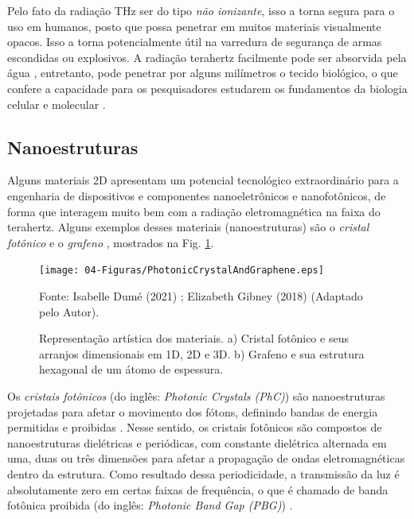 Pelo fato da radiação THz ser do tipo \textit{não ionizante}, isso a torna segura para o uso em humanos, posto que possa penetrar em muitos materiais visualmente opacos. Isso a torna potencialmente útil na varredura de segurança de armas escondidas ou explosivos. A radiação terahertz facilmente pode ser absorvida pela água \cite{fukunaga2009terahertz}, entretanto, pode penetrar por alguns milímetros o tecido biológico, o que confere a capacidade para os pesquisadores estudarem os fundamentos da biologia celular e molecular \cite{tsurkan2013impact}.

\subsection{Nanoestruturas}

Alguns materiais 2D apresentam um potencial tecnológico extraordinário para a engenharia de dispositivos e componentes nanoeletrônicos e nanofotônicos, de forma que interagem muito bem com a radiação eletromagnética na faixa do terahertz. Alguns exemplos desses materiais (nanoestruturas) são o \textit{cristal fotônico} e o \textit{grafeno} \cite{Wang2018THz,Vitiello_2019}, mostrados na Fig. \ref{fig: PhotonicCrystalAndGraphene}.

\begin{figure}[H]
    \centering
    \texttt{[image: 04-Figuras/PhotonicCrystalAndGraphene.eps]}
    \caption{Representação artística dos materiais. a) Cristal fotônico e seus arranjos dimensionais em 1D, 2D e 3D. b) Grafeno e sua estrutura hexagonal de um átomo de espessura.} \par
    Fonte: Isabelle Dumé (2021) \cite{Physicsworld2021Isabelle}; Elizabeth Gibney (2018) \cite{Nature2018Gibney} (Adaptado pelo Autor).
    \label{fig: PhotonicCrystalAndGraphene}
\end{figure}

Os \textit{cristais fotônicos} (do inglês: \textit{Photonic Crystals (PhC)}) são nanoestruturas projetadas para afetar o movimento dos fótons, definindo bandas de energia permitidas e proibidas \cite{ohtsu2008principles,shen2002nanophotonics}. Nesse sentido, os cristais fotônicos são compostos de nanoestruturas dielétricas e periódicas, com constante dielétrica alternada em uma, duas ou três dimensões para afetar a propagação de ondas eletromagnéticas dentro da estrutura. Como resultado dessa periodicidade, a transmissão da luz é absolutamente zero em certas faixas de frequência, o que é chamado de banda fotônica proibida (do inglês: \textit{Photonic Band Gap (PBG)}) \cite{yablonovitch1993photonic}.

